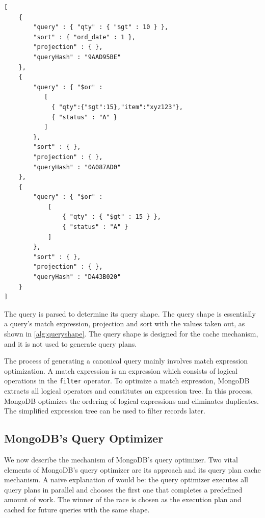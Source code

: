 \newpage
\begin{lstlisting}[caption={Examples of query shape}, label={alg:queryshape}]
[
    {
        "query" : { "qty" : { "$gt" : 10 } },
        "sort" : { "ord_date" : 1 },
        "projection" : { },
        "queryHash" : "9AAD95BE" 
    },
    {
        "query" : { "$or" :
           [
             { "qty":{"$gt":15},"item":"xyz123"},
             { "status" : "A" }
           ]
        },
        "sort" : { },
        "projection" : { },
        "queryHash" : "0A087AD0"  
    },
    {
        "query" : { "$or" : 
            [ 
                { "qty" : { "$gt" : 15 } }, 
                { "status" : "A" } 
            ] 
        },
        "sort" : { },
        "projection" : { },
        "queryHash" : "DA43B020"
    }
]
\end{lstlisting}

The query is parsed to determine its query shape.  The query shape is essentially a query's match expression, projection and sort with the values taken out, as shown in \autoref{alg:queryshape}. The query shape is designed for the cache mechanism, and it is not used to generate query plans. 



The process of generating a canonical query mainly involves match expression optimization. A match expression is an expression which consists of logical operations in the \verb|filter| operator. To optimize a match expression, MongoDB extracts all logical operators and constitutes an expression tree.  In this process, MongoDB optimizes the ordering of logical expressions and eliminates duplicates. The simplified expression tree can be used to filter records later. 


\subsection{MongoDB's \approachName Query Optimizer}
We now describe the mechanism of MongoDB's query optimizer. Two 
vital elements of MongoDB's query optimizer are its \approachName approach and 
its query plan cache mechanism. A naive explanation of \approachName would be: the query
optimizer executes all query plans in parallel and 
chooses the first one that completes a predefined amount of work. 
The winner of the race is chosen as the execution plan and cached for future queries with the same shape. 

